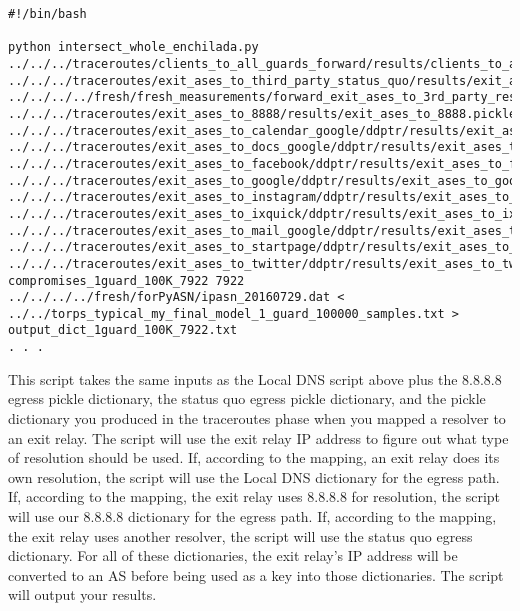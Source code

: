 \documentclass{article}
\begin{document}
\begin{lstlisting}[basicstyle=\scriptsize\ttfamily]
#!/bin/bash

python intersect_whole_enchilada.py ../../../traceroutes/clients_to_all_guards_forward/results/clients_to_all_guards_forward_dict.pickle ../../../traceroutes/exit_ases_to_third_party_status_quo/results/exit_ases_to_third_party.pickle ../../../../fresh/fresh_measurements/forward_exit_ases_to_3rd_party_resolvers/final_exit_ip_to_one_resolver_list_dict.pickle ../../../traceroutes/exit_ases_to_8888/results/exit_ases_to_8888.pickle ../../../traceroutes/exit_ases_to_calendar_google/ddptr/results/exit_ases_to_calendar_google_ddptr.pickle ../../../traceroutes/exit_ases_to_docs_google/ddptr/results/exit_ases_to_docs_google_ddptr.pickle ../../../traceroutes/exit_ases_to_facebook/ddptr/results/exit_ases_to_facebook_ddptr.pickle ../../../traceroutes/exit_ases_to_google/ddptr/results/exit_ases_to_google_ddptr.pickle ../../../traceroutes/exit_ases_to_instagram/ddptr/results/exit_ases_to_instagram_ddptr.pickle ../../../traceroutes/exit_ases_to_ixquick/ddptr/results/exit_ases_to_ixquick_ddptr.pickle ../../../traceroutes/exit_ases_to_mail_google/ddptr/results/exit_ases_to_mail_google_ddptr.pickle ../../../traceroutes/exit_ases_to_startpage/ddptr/results/exit_ases_to_startpage_ddptr.pickle ../../../traceroutes/exit_ases_to_twitter/ddptr/results/exit_ases_to_twitter_ddptr.pickle compromises_1guard_100K_7922 7922 ../../../../fresh/forPyASN/ipasn_20160729.dat < ../../torps_typical_my_final_model_1_guard_100000_samples.txt > output_dict_1guard_100K_7922.txt
. . .
\end{lstlisting}
This script 
takes the same inputs as the Local DNS script above plus the 8.8.8.8 egress 
pickle dictionary, the status quo egress pickle dictionary, and the pickle 
dictionary you produced in the traceroutes phase when you mapped a resolver to an 
exit relay. The script will use the exit relay IP address to figure out what type of 
resolution should be used. If, according to the mapping, an exit relay does its own 
resolution, the script will use the Local DNS dictionary for the egress path. If, 
according to the mapping, the exit relay uses 8.8.8.8 for resolution, the script will 
use our 8.8.8.8 dictionary for the egress path. If, according to the mapping, the exit 
relay uses another resolver, the script will use the status quo egress dictionary. For 
all of these dictionaries, the exit relay's IP address will be converted to an AS before 
being used as a key into those dictionaries. The script will output your results.
\end{document}
